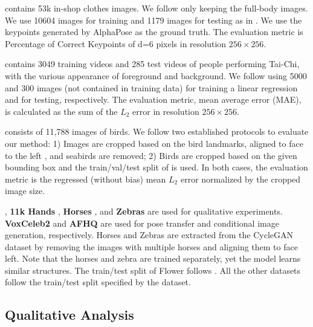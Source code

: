 \documentclass{article}
\begin{document}
\noindent{} \cite{liu2016deepfashion} contains 53k in-shop clothes images. We follow \cite{lorenz2019unsupervised} only keeping the full-body images. We use 10604 images for training and 1179 images for testing as in \cite{sandro2020unsupervised}. We use the keypoints generated by AlphaPose \cite{fang2017rmpe} as the ground truth. The evaluation metric is Percentage of Correct Keypoints of d=6 pixels in resolution $256\times 256$.

\noindent{} \cite{Siarohin_2019_NeurIPS} contains 3049 training videos and 285 test
videos of people performing Tai-Chi, with the various appearance of foreground and background. We follow \cite{siarohin2021motion} using 5000 and 300 images (not contained in training data) for training a linear regression and for testing, respectively. The evaluation metric, mean average error (MAE), is calculated as the sum of the $L_2$ error in resolution $256\times 256$.

\noindent{} \cite{WahCUB_200_2011} consists of 11,788 images of birds. We follow two established protocols \cite{lorenz2019unsupervised, choudhury2021unsupervised} to evaluate our method: 1) Images are cropped based on the bird landmarks, aligned to face to the left \cite{lorenz2019unsupervised}, and seabirds are removed; 2) Birds are cropped based on the given bounding box and the train/val/test split of \cite{choudhury2021unsupervised} is used. In both cases, the evaluation metric is the regressed (without bias) mean $L_2$ error normalized by the cropped image size.

\noindent{} \cite{Nilsback08}, \textbf{11k Hands} \cite{afifi201911kHands}, \textbf{Horses} \cite{zhu2017unpaired}, and \textbf{Zebras} \cite{zhu2017unpaired} are used for qualitative experiments. \textbf{VoxCeleb2} \cite{chung18voxceleb2} and \textbf{AFHQ} \cite{choi2020stargan} are used for pose transfer and conditional image generation, respectively. 
Horses and Zebras are extracted from the CycleGAN dataset \cite{zhu2017unpaired} by removing the images with multiple horses and aligning them to face left. Note that the horses and zebra are trained separately, yet the model learns similar structures. The train/test split of Flower follows \cite{chen2019unsupervised}. All the other datasets follow the train/test split specified by the dataset.

\subsection{Qualitative Analysis}
\end{document}
